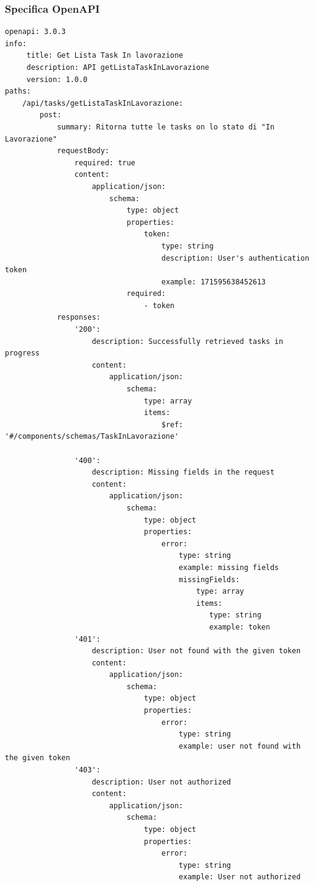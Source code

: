\documentclass{report}
\begin{document}
\subsubsection*{Specifica OpenAPI}

\begin{verbatim}
openapi: 3.0.3
info:
     title: Get Lista Task In lavorazione
     description: API getListaTaskInLavorazione
     version: 1.0.0
paths:
    /api/tasks/getListaTaskInLavorazione:
        post:
            summary: Ritorna tutte le tasks on lo stato di "In Lavorazione"
            requestBody:
                required: true
                content:
                    application/json:
                        schema:
                            type: object
                            properties:
                                token:
                                    type: string
                                    description: User's authentication token
                                    example: 171595638452613
                            required:
                                - token
            responses:
                '200':
                    description: Successfully retrieved tasks in progress
                    content:
                        application/json:
                            schema:
                                type: array
                                items:
                                    $ref: '#/components/schemas/TaskInLavorazione'

                '400':
                    description: Missing fields in the request
                    content:
                        application/json:
                            schema:
                                type: object
                                properties:
                                    error:
                                        type: string
                                        example: missing fields
                                        missingFields:
                                            type: array
                                            items:
                                               type: string
                                               example: token
                '401':
                    description: User not found with the given token
                    content:
                        application/json:
                            schema:
                                type: object
                                properties:
                                    error:
                                        type: string
                                        example: user not found with the given token
                '403':
                    description: User not authorized
                    content:
                        application/json:
                            schema:
                                type: object
                                properties:
                                    error:
                                        type: string
                                        example: User not authorized

\end{verbatim}
\end{document}

